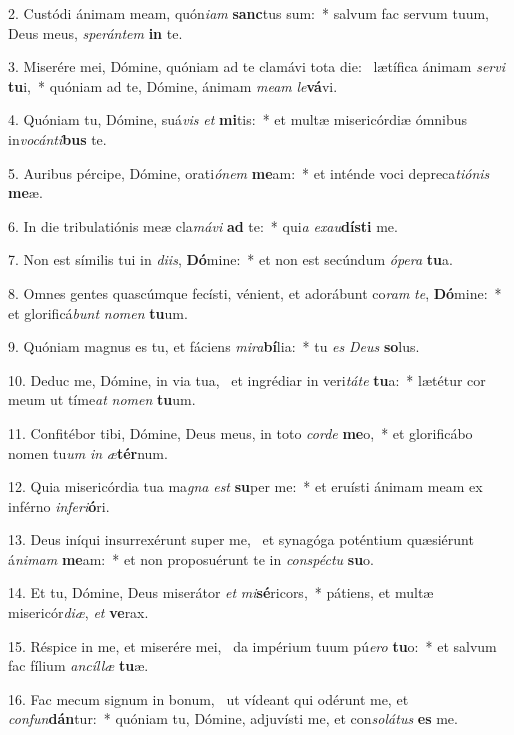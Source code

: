 2. Custódi ánimam meam, quón\textit{i}\textit{am} \textbf{sanc}tus sum:~*  salvum fac servum tuum, Deus meus, \textit{spe}\textit{rán}\textit{tem} \textbf{in} te.\

3. Miserére mei, Dómine, quóniam ad te clamávi tota die: \dag\  lætífica ánimam \textit{ser}\textit{vi} \textbf{tu}i,~*  quóniam ad te, Dómine, ánimam \textit{me}\textit{am} \textit{le}\textbf{vá}vi.\

4. Quóniam tu, Dómine, suá\textit{vis} \textit{et} \textbf{mi}tis:~*  et multæ misericórdiæ ómnibus in\textit{vo}\textit{cán}\textit{ti}\textbf{bus} te.\

5. Auribus pércipe, Dómine, orati\textit{ó}\textit{nem} \textbf{me}am:~*  et inténde voci depreca\textit{ti}\textit{ó}\textit{nis} \textbf{me}æ.\

6. In die tribulatiónis meæ cla\textit{má}\textit{vi} \textbf{ad} te:~*  qui\textit{a} \textit{ex}\textit{au}\textbf{dís}\textbf{ti} me.\

7. Non est símilis tui in \textit{di}\textit{is}, \textbf{Dó}mine:~*  et non est secúndum \textit{ó}\textit{pe}\textit{ra} \textbf{tu}a.\

8. Omnes gentes quascúmque fecísti, vénient, et adorábunt co\textit{ram} \textit{te}, \textbf{Dó}mine:~*  et glorificá\textit{bunt} \textit{no}\textit{men} \textbf{tu}um.\

9. Quóniam magnus es tu, et fáciens \textit{mi}\textit{ra}\textbf{bí}lia:~*  tu \textit{es} \textit{De}\textit{us} \textbf{so}lus.\

10. Deduc me, Dómine, in via tua, \dag\  et ingrédiar in veri\textit{tá}\textit{te} \textbf{tu}a:~*  lætétur cor meum ut tíme\textit{at} \textit{no}\textit{men} \textbf{tu}um.\

11. Confitébor tibi, Dómine, Deus meus, in toto \textit{cor}\textit{de} \textbf{me}o,~*  et glorificábo nomen tu\textit{um} \textit{in} \textit{æ}\textbf{tér}num.\

12. Quia misericórdia tua ma\textit{gna} \textit{est} \textbf{su}per me:~*  et eruísti ánimam meam ex inférno \textit{in}\textit{fe}\textit{ri}\textbf{ó}ri.\

13. Deus iníqui insurrexérunt super me, \dag\  et synagóga poténtium quæsiérunt á\textit{ni}\textit{mam} \textbf{me}am:~*  et non proposuérunt te in \textit{con}\textit{spéc}\textit{tu} \textbf{su}o.\

14. Et tu, Dómine, Deus miserátor \textit{et} \textit{mi}\textbf{sé}ricors,~*  pátiens, et multæ misericór\textit{di}\textit{æ}, \textit{et} \textbf{ve}rax.\

15. Réspice in me, et miserére mei, \dag\  da impérium tuum pú\textit{e}\textit{ro} \textbf{tu}o:~*  et salvum fac fílium \textit{an}\textit{cíl}\textit{læ} \textbf{tu}æ.\

16. Fac mecum signum in bonum, \dag\  ut vídeant qui odérunt me, et \textit{con}\textit{fun}\textbf{dán}tur:~*  quóniam tu, Dómine, adjuvísti me, et con\textit{so}\textit{lá}\textit{tus} \textbf{es} me.\


